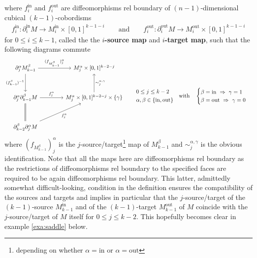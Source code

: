 where $f_{i}^{\mathrm{in}}$ and $f_{i}^{\mathrm{out}}$ are diffeomorphisms rel boundary of $(n-1)$-dimensional cubical $(k-1)$-cobordisms
\begin{align*}
  f_{i}^{\mathrm{in}}
  \colon
  \partial_{i}^{\mathrm{in}}M
  \to
  M_{i}^{\mathrm{in}}
  \times
  [0,1]^{k-1-i}
  \qquad
  \text{and}
  \qquad
  f_{i}^{\mathrm{out}}
  \colon
  \partial_{i}^{\mathrm{out}}M
  \to
  M_{i}^{\mathrm{out}}
  \times
  [0,1]^{k-1-i}
\end{align*}
for $0 \leq i \leq k-1$, called the the \textbf{$i$-source map} and \textbf{$i$-target map}, such that the following diagrams commute
\begin{equation*}
\begin{tikzcd}[row sep=3.2em,column sep=4.2em]
  \partial_{j}^{\alpha}
  M_{k-1}^{\beta}
  \ar{r}{(f_{M_{k-1}^{\beta}})_{j}^{\alpha}}
  \ar{d}[swap]{(f_{k-1}^{\beta})^{-1}}
  &
  M_{j}^{\alpha}
  \times
  [0,1]^{k-2-j}
  \\
  \partial_{j}^{\alpha}
  \partial_{k-1}^{\beta}
  M
  \ar{r}{f_{j}^{\alpha}}
  \ar[equals]{d}
  &
  M_{j}^{\alpha}
  \times
  [0,1]^{k-2-j}
  \times
  \lbrace
    \gamma
  \rbrace
  \ar{u}[swap]{\sim_{j}^{\alpha,\gamma}}
  \\
  \partial_{k-2}^{\beta}
  \partial_{j}^{\alpha}
  M
  \ar{ur}[swap]{f_{j}^{\alpha}}
  &
\end{tikzcd}
  \qquad
  \begin{aligned}
    &
    0
    \leq
    j
    \leq
    k-2
    \\
    &
    \alpha
    ,
    \beta
    \in
    \lbrace
      \mathrm{in}
      ,
      \mathrm{out}
    \rbrace
  \end{aligned}
  \quad
  \text{with}
  \quad
  \begin{cases}
    \beta
    =
    \mathrm{in}
    \ 
    \Rightarrow
    \ 
    \gamma
    =
    1
    \\
    \beta
    =
    \mathrm{out}
    \ 
    \Rightarrow
    \ 
    \gamma
    =
    0
  \end{cases}
\end{equation*}
where $(f_{M_{k-1}^{\beta}})_{j}^{\alpha}$ is the $j$-source/target\footnote{depending on whether $\alpha = \mathrm{in}$ or $\alpha = \mathrm{out}$} map of $M_{k-1}^{\beta}$ and $\sim_{j}^{\alpha,\gamma}$ is the obvious identification. Note that all the maps here are diffeomorphisms rel boundary as the restrictions of diffeomorphisms rel boundary to the specified faces are required to be again diffeomorphisms rel boundary. This latter, admittedly somewhat difficult-looking, condition in the definition ensures the compatibility of the sources and targets and implies in particular that the $j$-source/target of the $(k-1)$-source $M_{k-1}^{\mathrm{in}}$ and of the $(k-1)$-target $M_{k-1}^{\mathrm{out}}$ of $M$ coincide with the $j$-source/target of $M$ itself for $0 \leq j \leq k-2$. This hopefully becomes clear in example \ref{exa:saddle} below.
